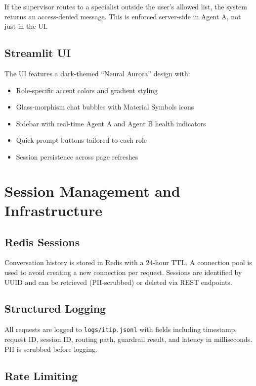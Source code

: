 \documentclass[12pt, a4paper]{article}
\begin{document}
If the supervisor routes to a specialist outside the user's allowed list, the system returns an access-denied message. This is enforced server-side in Agent A, not just in the UI.

\subsection{Streamlit UI}

The UI features a dark-themed ``Neural Aurora'' design with:
\begin{itemize}[leftmargin=1.5em]
    \item Role-specific accent colors and gradient styling
    \item Glass-morphism chat bubbles with Material Symbols icons
    \item Sidebar with real-time Agent A and Agent B health indicators
    \item Quick-prompt buttons tailored to each role
    \item Session persistence across page refreshes
\end{itemize}

\section{Session Management and Infrastructure}

\subsection{Redis Sessions}

Conversation history is stored in Redis with a 24-hour TTL. A connection pool is used to avoid creating a new connection per request. Sessions are identified by UUID and can be retrieved (PII-scrubbed) or deleted via REST endpoints.

\subsection{Structured Logging}

All requests are logged to \texttt{logs/itip.jsonl} with fields including timestamp, request ID, session ID, routing path, guardrail result, and latency in milliseconds. PII is scrubbed before logging.

\subsection{Rate Limiting}
\end{document}
